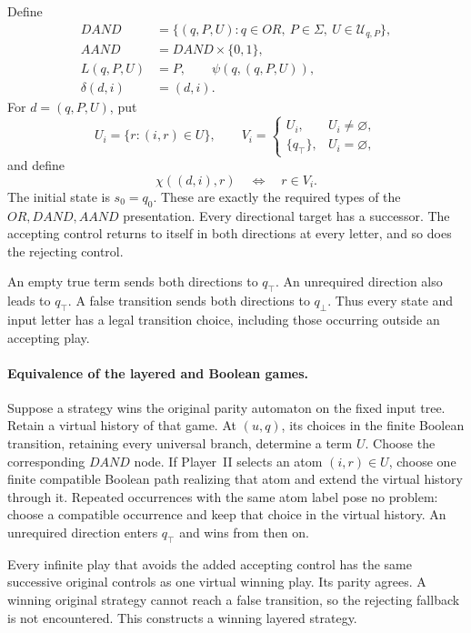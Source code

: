 Define
\[
\begin{aligned}
 DAND&=\{(q,P,U):q\in OR,\ P\in\Sigma,\
                              U\in\mathcal U_{q,P}\},\\
 AAND&=DAND\times\{0,1\},\\
 L(q,P,U)&=P,\qquad
 \psi(q,(q,P,U)),\\
 \delta(d,i)&=(d,i).
\end{aligned}
\]
For \(d=(q,P,U)\), put
\[
 U_i=\{r:(i,r)\in U\},\qquad
 V_i=
 \begin{cases}
  U_i,&U_i\ne\varnothing,\\
  \{q_\top\},&U_i=\varnothing,
 \end{cases}
\]
and define
\[
 \chi((d,i),r)\quad\Longleftrightarrow\quad r\in V_i.
\]
The initial state is
\(s_0=q_0\).
These are exactly the
required types of the
\(OR,DAND,AAND\) presentation.
Every directional target
has a successor.
The accepting control
returns to itself in
both directions at every
letter, and so does
the rejecting control.

An empty true term
sends both directions
to \(q_\top\).
An unrequired direction
also leads to \(q_\top\).
A false transition sends
both directions to
\(q_\bot\).
Thus every state and
input letter has a legal
transition choice, including
those occurring outside
an accepting play.

\paragraph{Equivalence of the layered and Boolean games.}
Suppose a strategy wins
the original parity automaton
on the fixed input tree.
Retain a virtual history
of that game.
At \((u,q)\), its choices
in the finite Boolean
transition, retaining every
universal branch, determine
a term \(U\).
Choose the corresponding
\(DAND\) node.
If Player~II selects an
atom \((i,r)\in U\),
choose one finite compatible
Boolean path realizing that
atom and extend the virtual
history through it.
Repeated occurrences with
the same atom label pose
no problem: choose a
compatible occurrence and
keep that choice in
the virtual history.
An unrequired direction
enters \(q_\top\) and
wins from then on.

Every infinite play that
avoids the added accepting
control has the same
successive original controls
as one virtual winning
play. Its parity agrees.
A winning original strategy
cannot reach a false
transition, so the rejecting
fallback is not encountered.
This constructs a winning
layered strategy.


